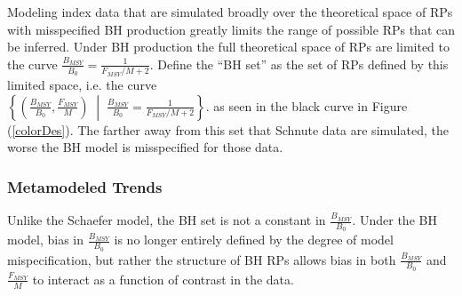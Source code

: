\documentclass[12pt]{article}
\begin{document}
%
%
%

%
Modeling index data that are simulated broadly over the theoretical space of RPs 
with misspecified BH production greatly limits the range of possible RPs that 
can be inferred. Under BH production the full theoretical space of RPs are 
limited to the curve \mbox{$\frac{B_{MSY}}{B_0}=\frac{1}{F_{MSY}/M+2}$.} Define the 
``BH set'' as the set of RPs defined by this limited space, i.e. the curve \\
$\left\{\left(\frac{B_{MSY}}{B_0}, \frac{F_{MSY}}{M}\right) \;\middle|\; \frac{B_{MSY}}{B_0}=\frac{1}{F_{MSY}/M+2}\right\}$.
as seen in the black curve in Figure (\ref{colorDes}).
The farther away from this set that Schnute data are simulated, the worse the 
BH model is misspecified for those data. 


%
\subsubsection{Metamodeled Trends}


%
Unlike the Schaefer model, the BH set is not a constant in 
$\frac{B_{MSY}}{B_0}$. Under the BH model, bias in $\frac{B_{MSY}}{B_0}$ is no 
longer entirely defined by the degree of model mispecification, but rather the 
structure of BH RPs allows bias in both $\frac{B_{MSY}}{B_0}$ and $\frac{F_{MSY}}{M}$ 
to interact as a function of contrast in the data.
\end{document}

